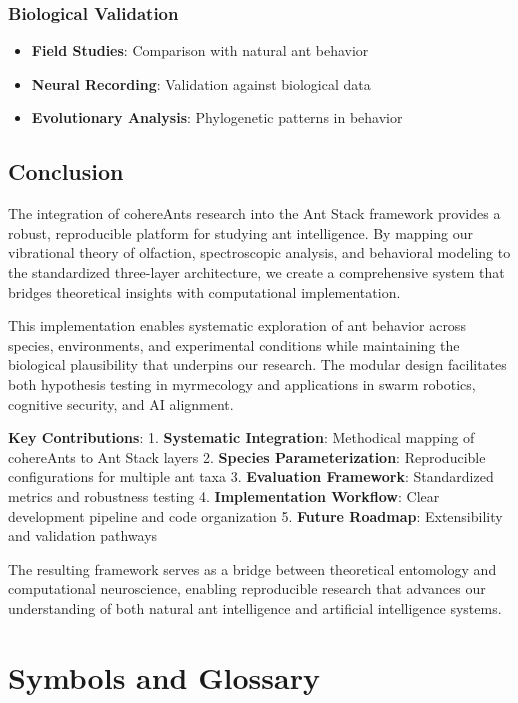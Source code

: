 \documentclass[
  13pt,
  a4paperpaper,
  12pt]{article}
\providecommand{\tightlist}{%
  \setlength{\itemsep}{0pt}\setlength{\parskip}{0pt}}
\let\oldsection\section
\renewcommand{\section}{\clearpage\oldsection}
\begin{document}
\subsubsection{Biological Validation}\label{biological-validation}

\begin{itemize}
\tightlist
\item
  \textbf{Field Studies}: Comparison with natural ant behavior
\item
  \textbf{Neural Recording}: Validation against biological data
\item
  \textbf{Evolutionary Analysis}: Phylogenetic patterns in behavior
\end{itemize}

\subsection{Conclusion}\label{conclusion-1}

The integration of cohereAnts research into the Ant Stack framework
provides a robust, reproducible platform for studying ant intelligence.
By mapping our vibrational theory of olfaction, spectroscopic analysis,
and behavioral modeling to the standardized three-layer architecture, we
create a comprehensive system that bridges theoretical insights with
computational implementation.

This implementation enables systematic exploration of ant behavior
across species, environments, and experimental conditions while
maintaining the biological plausibility that underpins our research. The
modular design facilitates both hypothesis testing in myrmecology and
applications in swarm robotics, cognitive security, and AI alignment.

\textbf{Key Contributions}: 1. \textbf{Systematic Integration}:
Methodical mapping of cohereAnts to Ant Stack layers 2. \textbf{Species
Parameterization}: Reproducible configurations for multiple ant taxa 3.
\textbf{Evaluation Framework}: Standardized metrics and robustness
testing 4. \textbf{Implementation Workflow}: Clear development pipeline
and code organization 5. \textbf{Future Roadmap}: Extensibility and
validation pathways

The resulting framework serves as a bridge between theoretical
entomology and computational neuroscience, enabling reproducible
research that advances our understanding of both natural ant
intelligence and artificial intelligence systems.

\section{Symbols and Glossary}\label{sec:symbols_glossary}
\end{document}

